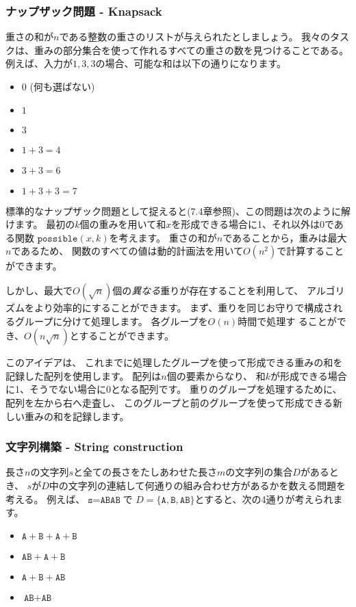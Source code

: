 \subsubsection{ナップザック問題 - Knapsack}

重さの和が$n$である整数の重さのリストが与えられたとしましょう。
我々のタスクは、重みの部分集合を使って作れるすべての重さの数を見つけることである。
例えば、入力が${1, 3, 3}$の場合、可能な和は以下の通りになります。

\begin{itemize}[noitemsep]
\item $0$ (何も選ばない)
\item $1$
\item $3$
\item $1+3=4$
\item $3+3=6$
\item $1+3+3=7$
\end{itemize}

標準的なナップザック問題として捉えると(7.4章参照)、この問題は次のように解けます。
最初の$k$個の重みを用いて和$x$を形成できる場合に1、それ以外は0である関数
$\texttt{possible}(x,k)$を考えます。
重さの和が$n$であることから，重みは最大$n$であるため、
関数のすべての値は動的計画法を用いて$O(n^2)$で計算することができます。

しかし、最大で$O(\sqrt n)$個の\emph{異なる}重りが存在することを利用して、
アルゴリズムをより効率的にすることができます。
まず、重りを同じお守りで構成されるグループに分けて処理します。
各グループを$O(n)$時間で処理す ることができ、$O(n \sqrt n)$とすることができます。

このアイデアは、
これまでに処理したグループを使って形成できる重みの和を記録した配列を使用します。
配列は$n$個の要素からなり、
和$k$が形成できる場合に1、そうでない場合に0となる配列です。
重りのグループを処理するために、配列を左から右へ走査し、
このグループと前のグループを使って形成できる新しい重みの和を記録します。

\subsubsection{文字列構築 - String construction}

長さ$n$の文字列$s$と全ての長さをたしあわせた長さ$m$の文字列の集合$D$があるとき、
$s$が$D$中の文字列の連結して何通りの組み合わせ方があるかを数える問題を考える。
例えば、$\texttt{s}=\texttt{ABAB}$で
$D=\{\texttt{A},\texttt{B},\texttt{AB}\}$とすると、次の4通りが考えられます。

\begin{itemize}[noitemsep]
\item $\texttt{A}+\texttt{B}+\texttt{A}+\texttt{B}$
\item $\texttt{AB}+\texttt{A}+\texttt{B}$
\item $\texttt{A}+\texttt{B}+\texttt{AB}$
\item $\texttt{AB}+\texttt{AB}$
\end{itemize}

